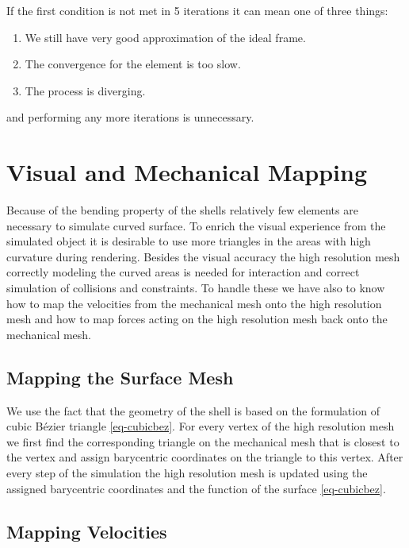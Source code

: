 \documentclass{egpubl}
\begin{document}
If the first condition is not met in 5 iterations it can mean one of three
things:

\begin{enumerate}
    \item We still have very good approximation of the ideal frame.
    \item The convergence for the element is too slow.
    \item The process is diverging.
\end{enumerate}

\noindent
and performing any more iterations is unnecessary.






\section{Visual and Mechanical Mapping} %

Because of the bending property of the shells relatively few elements are
necessary to simulate curved surface. To enrich the visual experience from
the simulated object it is desirable to use more triangles in the areas
with high curvature during rendering. Besides the visual accuracy the high
resolution mesh correctly modeling the curved areas is needed for
interaction and correct simulation of collisions and constraints. To handle
these we have also to know how to map the velocities from the mechanical
mesh onto the high resolution mesh and how to map forces acting on the high
resolution mesh back onto the mechanical mesh.

\subsection{Mapping the Surface Mesh}

We use the fact that the geometry of the shell is based on the formulation
of cubic B\'ezier triangle \eqref{eq-cubicbez}. For every vertex of the high
resolution mesh we first find the corresponding triangle on the mechanical
mesh that is closest to the vertex and assign barycentric coordinates on
the triangle to this vertex. After every step of the simulation the high
resolution mesh is updated using the assigned barycentric coordinates and
the function of the surface \eqref{eq-cubicbez}.

\subsection{Mapping Velocities}
\end{document}
